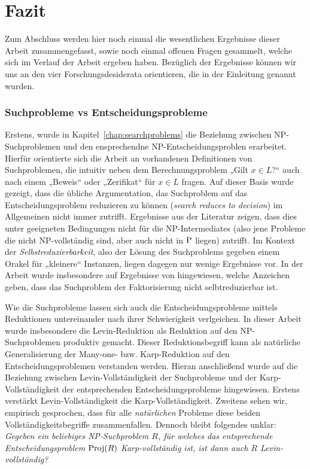 \chapter{Fazit}\label{chap:conclusion}

Zum Abschluss werden hier noch einmal die wesentlichen Ergebnisse dieser Arbeit zusammengefasst, sowie noch einmal offenen Fragen gesammelt, welche sich im Verlauf der Arbeit ergeben haben.
Bezüglich der Ergebnisse können wir uns an den vier Forschungsdesiderata orientieren, die in der Einleitung genannt wurden.

\subsection*{Suchprobleme vs Entscheidungsprobleme}

Erstens, wurde in Kapitel~\ref{chap:searchproblems} die Beziehung zwischen NP-Suchproblemen und den ensprechendne NP-Entscheidungsproblen erarbeitet.
Hierfür orientierte sich die Arbeit an vorhandenen Definitionen von Suchproblemen, die intuitiv neben dem Berechnungsproblem „Gilt $x\in L$?“ auch nach einem „Beweis“ oder „Zerifikat“ für $x\in L$ fragen. %
Auf dieser Basis wurde gezeigt, dass die übliche Argumentation, das Suchproblem auf das Entscheidungsproblem reduzieren zu können (\emph{search reduces to decision}) im Allgemeinen nicht immer zutrifft. Ergebnisse aus der Literatur zeigen, dass dies unter geeigneten Bedingungen nicht für die NP-Intermediates (also jene Probleme die nicht NP-vollständig sind, aber auch nicht in $\P$ liegen) zutrifft.
Im Kontext der \emph{Selbstreduzierbarkeit}, also der Lösung des Suchproblems gegeben einem Orakel für „kleinere“ Instanzen, liegen dagegen nur wenige Ergebnisse vor. In der Arbeit wurde insbesondere auf Ergebnisse von \textcite{harsha_downward_2023} hingewiesen, welche Anzeichen geben, dass das Suchproblem der Faktorisierung nicht selbtreduzierbar ist.

Wie die Suchprobleme lassen sich auch die Entscheidungsprobleme mittels Reduktionen untereinander nach ihrer Schwierigkeit verlgeichen. In dieser Arbeit wurde insbesondere die Levin-Reduktion als Reduktion auf den NP-Suchproblemen produktiv gemacht. Dieser Reduktionsbegriff kann als natürliche Generalisierung der Many-one- bzw. Karp-Reduktion auf den Entscheidungsproblemen verstanden werden. Hieran anschließend wurde auf die Beziehung zwischen Levin-Vollständigkeit der Suchprobleme und der Karp-Vollständigkeit der entsprechenden Entscheidungsprobleme hingewiesen. Erstens verstärkt Levin-Vollständigkeit die Karp-Vollständigkeit. Zweitens sehen wir, empirisch gesprochen, dass für alle \emph{natürlichen} Probleme diese beiden Vollständigkeitsbegriffe zusammenfallen. 
Dennoch bleibt folgendes unklar: \emph{Gegeben ein beliebiges NP-Suchproblem $R$, für welches das entsprechende Entscheidungsproblem $\Proj(R)$ Karp-vollständig ist, ist dann auch $R$ Levin-vollständig?}

